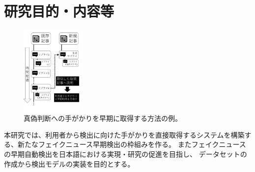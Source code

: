 
\section{研究目的・内容等}

\vspace{20pt}

\setlength\intextsep{0pt}
\setlength\textfloatsep{0pt}
\begin{figure}
    \vspace{-2\baselineskip}
    \centering
    \includegraphics[width=0.27\textwidth]{figs/final.pdf}
    \vspace{-1.6cm} 
    \caption{真偽判断への手がかりを早期に取得する方法の例。}
    \label{fig:dataset}
    \vspace{-4\baselineskip}
\end{figure}

本研究では、利用者から検出に向けた手がかりを直接取得するシステムを構築する、新たなフェイクニュース早期検出の枠組みを作る。
またフェイクニュースの早期自動検出を日本語における実現・研究の促進を目指し、
データセットの作成から検出モデルの実装を目的とする。


